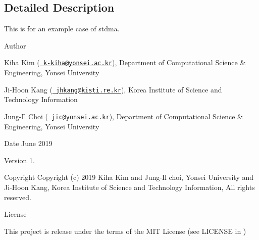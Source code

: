 \subsection{Detailed Description}
This is for an example case of stdma. 

\begin{DoxyAuthor}{Author}

\end{DoxyAuthor}

\begin{DoxyItemize}
\item Kiha Kim (\href{mailto:k-kiha@yonsei.ac.kr}{\texttt{ k-\/kiha@yonsei.\+ac.\+kr}}), Department of Computational Science \& Engineering, Yonsei University
\item Ji-\/\+Hoon Kang (\href{mailto:jhkang@kisti.re.kr}{\texttt{ jhkang@kisti.\+re.\+kr}}), Korea Institute of Science and Technology Information
\item Jung-\/\+Il Choi (\href{mailto:jic@yonsei.ac.kr}{\texttt{ jic@yonsei.\+ac.\+kr}}), Department of Computational Science \& Engineering, Yonsei University
\end{DoxyItemize}

\begin{DoxyDate}{Date}
June 2019 
\end{DoxyDate}
\begin{DoxyVersion}{Version}
1. 
\end{DoxyVersion}
\begin{DoxyParagraph}{Copyright}
Copyright (c) 2019 Kiha Kim and Jung-\/\+Il choi, Yonsei University and Ji-\/\+Hoon Kang, Korea Institute of Science and Technology Information, All rights reserved. 
\end{DoxyParagraph}
\begin{DoxyParagraph}{License }

\end{DoxyParagraph}
This project is release under the terms of the M\+IT License (see L\+I\+C\+E\+N\+SE in ) 